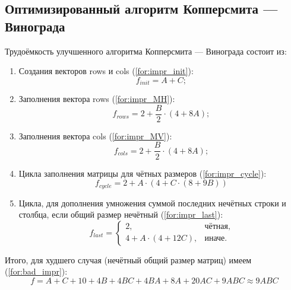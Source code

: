 \subsection{Оптимизированный алгоритм Копперсмита — Винограда}

Трудоёмкость улучшенного алгоритма Копперсмита — Винограда состоит из:
\begin{enumerate}
    \item Создания векторов rows и cols (\ref{for:impr_init}):
    \begin{equation}
        \label{for:impr_init}
        f_{init} = A + C;
    \end{equation}

    \item Заполнения вектора rows (\ref{for:impr_MH}):
    \begin{equation}
        \label{for:impr_MH}
        f_{rows} = 2 + \frac{B}{2} \cdot (4 + 8A);
    \end{equation}

    \item Заполнения вектора cols (\ref{for:impr_MV}):
    \begin{equation}
        \label{for:impr_MV}
        f_{cols} = 2 + \frac{B}{2} \cdot (4 + 8A);
    \end{equation}

    \item Цикла заполнения матрицы для чётных размеров (\ref{for:impr_cycle}):
    \begin{equation}
        \label{for:impr_cycle}
        f_{cycle} = 2 + A \cdot (4 + C \cdot (8 + 9B))
    \end{equation}

    \item Цикла, для дополнения умножения суммой последних нечётных строки и столбца, если общий размер нечётный (\ref{for:impr_last}):
    \begin{equation}
        \label{for:impr_last}
        f_{last} =
        \begin{cases}
            2, & \text{чётная,}\\
            4 + A \cdot (4 + 12C), & \text{иначе.}
        \end{cases}
    \end{equation}
\end{enumerate}

Итого, для худшего случая (нечётный общий размер матриц) имеем (\ref{for:bad_impr}):
\begin{equation}
    \label{for:bad_impr}
    f = A + C + 10 + 4B + 4BC + 4BA + 8A + 20AC + 9ABC \approx 9ABC
\end{equation}

